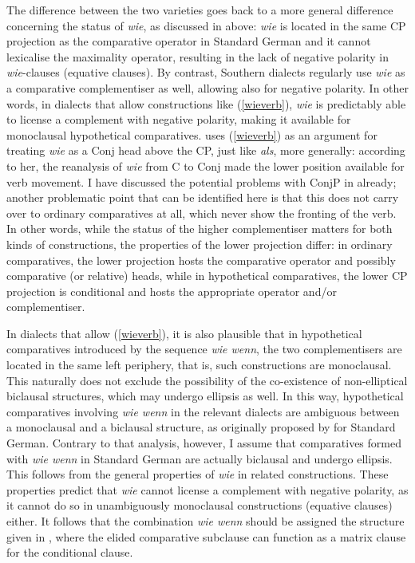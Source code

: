 The difference between the two varieties goes back to a more general difference concerning the status of \textit{wie}, as discussed in  above: \textit{wie} is located in the same CP projection as the comparative operator in Standard German and it cannot lexicalise the maximality operator, resulting in the lack of negative polarity in \textit{wie}-clauses (equative clauses). By contrast, Southern dialects regularly use \textit{wie} as a comparative complementiser as well, allowing also for negative polarity. In other words, in dialects that allow constructions like (\ref{wieverb}), \textit{wie} is predictably able to license a complement with negative polarity, making it available for monoclausal hypothetical comparatives. \citet[473--482]{jaeger2018} uses (\ref{wieverb}) as an argument for treating \textit{wie} as a Conj head above the CP, just like \textit{als}, more generally: according to her, the reanalysis of \textit{wie} from C to Conj made the lower position available for verb movement. I have discussed the potential problems with ConjP in  already; another problematic point that can be identified here is that this does not carry over to ordinary comparatives at all, which never show the fronting of the verb. In other words, while the status of the higher complementiser matters for both kinds of constructions, the properties of the lower projection differ: in ordinary comparatives, the lower projection hosts the comparative operator and possibly comparative (or relative) heads, while in hypothetical comparatives, the lower CP projection is conditional and hosts the appropriate operator and/or complementiser.

In dialects that allow (\ref{wieverb}), it is also plausible that in hypothetical comparatives introduced by the sequence \textit{wie wenn}, the two complementisers are located in the same left periphery, that is, such constructions are monoclausal. This naturally does not exclude the possibility of the co-existence of non-elliptical biclausal structures, which may undergo ellipsis as well. In this way, hypothetical comparatives involving \textit{wie wenn} in the relevant dialects are ambiguous between a monoclausal and a biclausal structure, as originally proposed by \citet{bacskaiatkari2018jb} for Standard German. Contrary to that analysis, however, I assume that comparatives formed with \textit{wie wenn} in Standard German are actually biclausal and undergo ellipsis. This follows from the general properties of \textit{wie} in related constructions. These properties predict that \textit{wie} cannot license a complement with negative polarity, as it cannot do so in unambiguously monoclausal constructions (equative clauses) either. It follows that the combination \textit{wie wenn} should be assigned the structure given in , where the elided comparative subclause can function as a matrix clause for the conditional clause.

